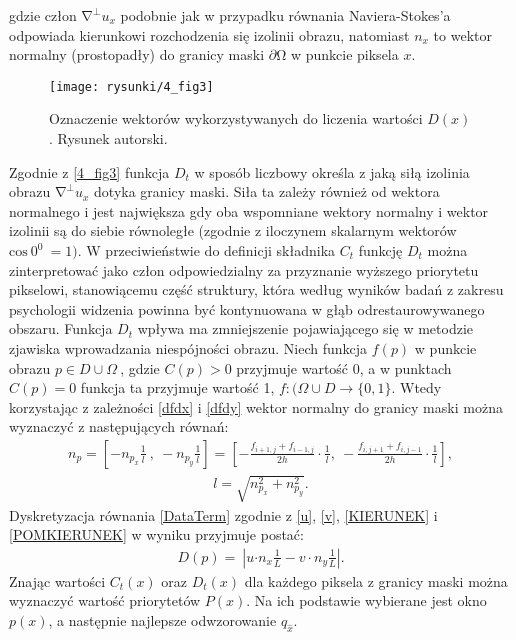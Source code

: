 \documentclass[12pt, twoside, openany]{report}
\theoremstyle{definition}
\begin{document}
gdzie człon ${\mathrm{\nabla }}^{\bot }u_x$ podobnie jak w przypadku równania Naviera-Stokes'a odpowiada kierunkowi rozchodzenia się izolinii obrazu, natomiast  $n_x$ to wektor normalny (prostopadły) do granicy maski $\partial \mathrm{\Omega }$ w punkcie piksela $x$.
\begin{figure}[!h]
	\centering
	\texttt{[image: rysunki/4\_fig3]}
	\caption{Oznaczenie wektorów wykorzystywanych do liczenia wartości $D(x)$. Rysunek autorski.}
	\label{4_fig3} 
\end{figure}
Zgodnie z \autoref{4_fig3} funkcja $D_t$ w sposób liczbowy określa z jaką siłą izolinia obrazu ${\mathrm{\nabla }}^{\bot }u_x$ dotyka granicy maski. Siła ta zależy również od wektora normalnego i jest największa gdy oba wspomniane wektory normalny i wektor izolinii są do siebie równoległe (zgodnie z iloczynem skalarnym wektorów ${\mathrm{cos} \ 0^0\ }=1)$.
W przeciwieństwie do definicji składnika $C_t$ funkcję $D_t$ można zinterpretować jako człon odpowiedzialny za przyznanie wyższego priorytetu pikselowi, stanowiącemu część struktury, która według wyników badań z zakresu psychologii widzenia powinna być kontynuowana w głąb odrestaurowywanego obszaru. Funkcja $D_t$ wpływa ma zmniejszenie pojawiającego się w metodzie zjawiska wprowadzania niespójności obrazu. Niech funkcja $f(p)$ w punkcie obrazu $p \in D \cup \Omega \ $, gdzie $C(p) > 0$ przyjmuje wartość 0, a w punktach $C(p) = 0$ funkcja ta przyjmuje wartość 1, $f : (\Omega \cup D \to \{0,1\}$.  Wtedy korzystając z zależności \eqref{dfdx} i \eqref{dfdy} wektor normalny do granicy maski można wyznaczyć z następujących równań:
\begin{align}
n_p= \left[-n_{p_x}\frac{1}{l}\ ,\ -n_{p_y} \frac{1}{l}\right] =\left[-\frac{f_{i+1,j}+f_{i-1,j}}{2h}\cdot \frac{1}{l}, \  -\frac{f_{i,j+1} + f_{i,j-1}}{2h} \cdot \frac{1}{l}\right],
\label{KIERUNEK}
\end{align}
\begin{align}
l= \sqrt{n^2_{p_x} + n^2_{p_y}}.
\label{POMKIERUNEK}
\end{align}
Dyskretyzacja równania \eqref{DataTerm} zgodnie z \eqref{u}, \eqref{v}, \eqref{KIERUNEK} i \eqref{POMKIERUNEK} w wyniku przyjmuje postać:
\begin{align}
D(p)=\ \left|u{\cdot n}_x\frac{1}{L}-v\cdot n_y\frac{1}{L}\right|.
\end{align}
Znając wartości $C_t\left(x\right)$ oraz $D_t(x)$ dla każdego piksela z granicy maski można wyznaczyć wartość priorytetów $P(x)$. Na ich podstawie wybierane jest okno $p(x)$, a następnie najlepsze odwzorowanie $q_{\hat{x}}$.
\end{document}

